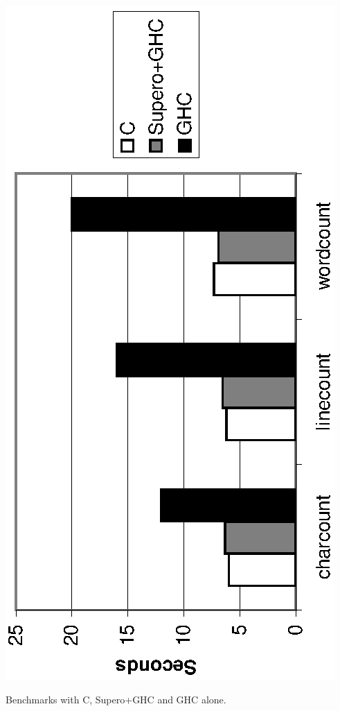 \begin{fig}
\vspace{4mm}
\begin{center}
\includegraphics[scale=0.75,angle=270]{wc.eps}
\end{center}
\vspace{1mm}
\figend
\caption{Benchmarks with C, Supero+GHC and GHC alone.}
\label{fig:c_results}
\end{fig}

